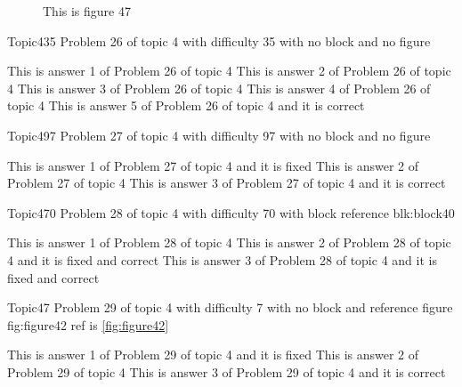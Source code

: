 \documentclass[master]{exam}
\begin{document}
\begin{figure}
	\begin{center}
		This is figure 47 
		\label{fig:figure47}
	\end{center}
\end{figure}

\begin{problem}{Topic4}{35}
	Problem 26 of topic 4 with difficulty 35 with no block and no figure
	\begin{answers}
		\answer This is answer 1 of Problem 26 of topic 4 
		\answer This is answer 2 of Problem 26 of topic 4 
		\answer This is answer 3 of Problem 26 of topic 4 
		\answer This is answer 4 of Problem 26 of topic 4 
		\answer[correct] This is answer 5 of Problem 26 of topic 4 and it is correct
	\end{answers}
\end{problem}

\begin{problem}{Topic4}{97}
	Problem 27 of topic 4 with difficulty 97 with no block and no figure
	\begin{answers}
		\answer[fixed] This is answer 1 of Problem 27 of topic 4 and it is fixed
		\answer This is answer 2 of Problem 27 of topic 4 
		\answer[correct] This is answer 3 of Problem 27 of topic 4 and it is correct
	\end{answers}
\end{problem}

\begin{problem}[requires=blk:block40]{Topic4}{70}
	Problem 28 of topic 4 with difficulty 70 with block reference blk:block40
	\begin{answers}
		\answer This is answer 1 of Problem 28 of topic 4 
		 This is answer 2 of Problem 28 of topic 4 and it is fixed and correct
		 This is answer 3 of Problem 28 of topic 4 and it is fixed and correct
	\end{answers}
\end{problem}

\begin{problem}{Topic4}{7}
	Problem 29 of topic 4 with difficulty 7 with no block and reference figure fig:figure42 ref is \ref{fig:figure42}
	\begin{answers}
		\answer[fixed] This is answer 1 of Problem 29 of topic 4 and it is fixed
		\answer This is answer 2 of Problem 29 of topic 4 
		\answer[correct] This is answer 3 of Problem 29 of topic 4 and it is correct
	\end{answers}
\end{problem}
\end{document}
